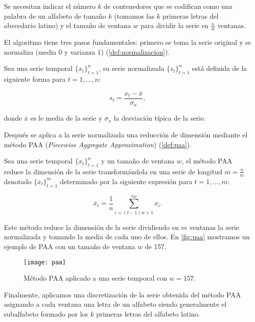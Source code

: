 Se necesitan indicar el número $k$ de contenedores que se codifican como una palabra de un alfabeto de tamaño $k$ (tomamos las $k$ primeras letras del abecedario latino) y el tamaño de ventana $w$ para dividir la serie en $\frac{n}{w}$ ventanas.

El algoritmo tiene tres pasos fundamentales: primero se toma la serie original y se normaliza (media 0 y varianza 1) (\autoref{def:normalizacion}).

\begin{definicion}[Normalización]
  Sea una serie temporal $\{x_t\}_{t = 1}^n$, su serie normalizada $\{s_t\}_{t = 1}^n$ está definida de la siguiente forma para $t = 1, \ldots, n$:

  $$s_t = \dfrac{x_t - \overline{x}}{\sigma_x},$$

  donde $\overline{x}$ es le media de la serie y $\sigma_x$ la desviación típica de la serie.
  \label{def:normalizacion}
\end{definicion}

Después se aplica a la serie normalizada una reducción de dimensión mediante el método PAA (\emph{Piecewise Aggregate Approximation}) \cite{keogh2001dimensionality} (\autoref{def:paa}).

\begin{definicion}[PAA]
  Sea una serie temporal $\{x_t\}_{t = 1}^n$ y un tamaño de ventana $w$, el método PAA reduce la dimensión de la serie transformándola en una serie de longitud $m = \frac{n}{w}$ denotado $\{\overline{x}_t\}_{t = 1}^m$ determinado por la siguiente expresión para $t = 1, \ldots, m$:

  $$\overline{x}_t = \dfrac{1}{n} \sum \limits_{i = (t-1)w + 1}^{tw} x_i.$$
  \label{def:paa}
\end{definicion}

Este método reduce la dimensión de la serie dividiendo en $m$ ventanas la serie normalizada y tomando la media de cada uno de ellos. En \autoref{fig:paa} mostramos un ejemplo de PAA con un tamaño de ventana $w$ de 157.

\begin{figure}[htpb]
  \centering
  \texttt{[image: paa]}
  \caption{Método PAA aplicado a una serie temporal con $w = 157$.}
  \label{fig:paa}
\end{figure}

Finalmente, aplicamos una discretización de la serie obtenida del método PAA asignando a cada ventana una letra de un alfabeto siendo generalmente el subalfabeto formado por los $k$ primeras letras del alfabeto latino.

